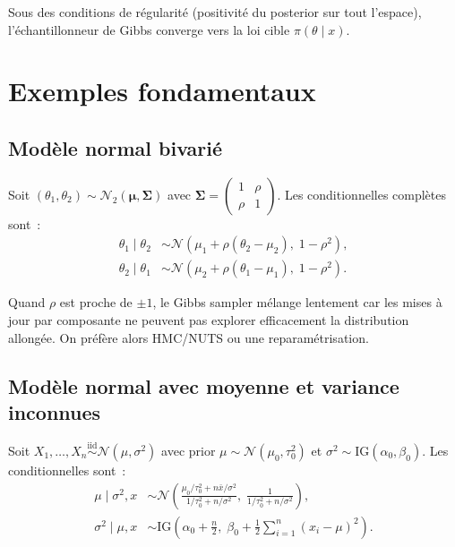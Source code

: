\begin{theoreme}
Sous des conditions de r\'egularit\'e (positivit\'e du posterior sur
tout l'espace), l'\'echantillonneur de Gibbs converge vers la loi
cible $\pi(\theta \mid x)$.
\end{theoreme}

\section{Exemples fondamentaux}

\subsection{Mod\`ele normal bivari\'e}

\begin{exemple}
Soit $(\theta_1, \theta_2) \sim \mathcal{N}_2(\boldsymbol{\mu}, \boldsymbol{\Sigma})$
avec $\boldsymbol{\Sigma} = \begin{pmatrix} 1 & \rho \\ \rho & 1 \end{pmatrix}$.
Les conditionnelles compl\`etes sont~:
\begin{align*}
  \theta_1 \mid \theta_2 &\sim \mathcal{N}(\mu_1 + \rho(\theta_2 - \mu_2),\; 1 - \rho^2), \\
  \theta_2 \mid \theta_1 &\sim \mathcal{N}(\mu_2 + \rho(\theta_1 - \mu_1),\; 1 - \rho^2).
\end{align*}
\end{exemple}

\begin{attention}[title=\textbf{Forte corr\'elation}]
Quand $\rho$ est proche de $\pm 1$, le Gibbs sampler m\'elange lentement
car les mises \`a jour par composante ne peuvent pas explorer
efficacement la distribution allong\'ee. On pr\'ef\`ere alors HMC/NUTS
ou une reparam\'etrisation.
\end{attention}

\subsection{Mod\`ele normal avec moyenne et variance inconnues}

\begin{exemple}
Soit $X_1, \ldots, X_n \overset{\text{iid}}{\sim} \mathcal{N}(\mu, \sigma^2)$
avec prior $\mu \sim \mathcal{N}(\mu_0, \tau_0^2)$ et
$\sigma^2 \sim \text{IG}(\alpha_0, \beta_0)$. Les conditionnelles sont~:
\begin{align*}
  \mu \mid \sigma^2, x &\sim \mathcal{N}\!\left(
  \frac{\mu_0/\tau_0^2 + n\bar{x}/\sigma^2}{1/\tau_0^2 + n/\sigma^2},\;
  \frac{1}{1/\tau_0^2 + n/\sigma^2}\right), \\
  \sigma^2 \mid \mu, x &\sim \text{IG}\!\left(
  \alpha_0 + \frac{n}{2},\;
  \beta_0 + \frac{1}{2}\sum_{i=1}^n (x_i - \mu)^2\right).
\end{align*}
\end{exemple}

